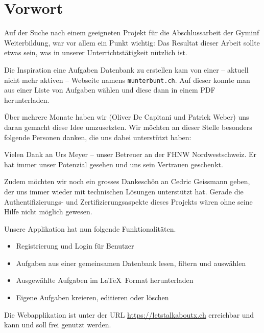 \section{Vorwort}

Auf der Suche nach einem geeigneten Projekt für die Abschlussarbeit der Gyminf Weiterbildung, war vor allem ein Punkt wichtig: Das Resultat dieser Arbeit sollte etwas sein, was in unserer Unterrichtstätigkeit nützlich ist. 

Die Inspiration eine Aufgaben Datenbank zu erstellen kam von einer -- aktuell nicht mehr aktiven -- Webseite namens \verb|munterbunt.ch|. Auf dieser konnte man aus einer Liste von Aufgaben wählen und diese dann in einem PDF herunterladen. 

Über mehrere Monate haben wir (Oliver De Capitani und Patrick Weber) uns daran gemacht diese Idee umzusetzten. Wir möchten an dieser Stelle besonders folgende Personen danken, die uns dabei unterstützt haben: 

Vielen Dank an Urs Meyer -- unser Betreuer an der FHNW Nordwestschweiz. Er hat immer unser Potenzial gesehen und uns sein Vertrauen geschenkt. 

Zudem möchten wir noch ein grosses Dankeschön an Cedric Geissmann geben, der uns immer wieder mit technischen Lösungen unterstützt hat. Gerade die Authentifizierungs- und Zertifizierungsaspekte dieses Projekts wären ohne seine Hilfe nicht möglich gewesen.

Unsere Applikation hat nun folgende Funktionalitäten.
\begin{itemize}
  \item Registrierung und Login für Benutzer
  \item Aufgaben aus einer gemeinsamen Datenbank lesen, filtern und auswählen
  \item Ausgewählte Aufgaben im \LaTeX\  Format herunterladen
  \item Eigene Aufgaben kreieren, editieren oder löschen
\end{itemize}

Die Webapplikation ist unter der URL \url{https://letstalkaboutx.ch} erreichbar und kann und soll frei genutzt werden.